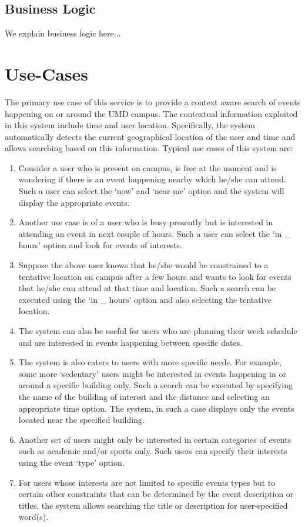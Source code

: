 \documentclass{acm_proc_article-sp}
\begin{document}
\subsection{Business Logic}
We explain business logic here...

\section{Use-Cases}
The primary use case of this service is to provide a context aware search of events happening on or around the UMD campus. The contextual information exploited in this system include time and user location. Specifically, the system automatically detects the current geographical location of the user and time and allows searching based on this information. Typical use cases of this system are:
\begin{enumerate}
\item{Consider a user who is present on campus, is free at the moment and is wondering if there is an event happening nearby which he/she can attend. Such a user can select the `now' and `near me' option and the system will display the appropriate events.}
\item{Another use case is of a user who is busy presently but is interested in attending an event in next couple of hours. Such a user can select the `in \_ hours' option and look for events of interests.}
\item{Suppose the above user knows that he/she would be constrained to a tentative location on campus after a few hours and wants to look for events that he/she can attend at that time and location. Such a search can be executed using the `in \_ hours' option and also selecting the tentative location.}
\item{The system can also be useful for users who are planning their week schedule and are interested in events happening between specific dates. }
\item{The system is also caters to users with more specific needs. For example, some more `sedentary' users might be interested in events happening in or around a specific building only. Such a search can be executed by specifying the name of the building of interest and the distance and selecting an appropriate time option. The system, in such a case displays only the events located near the specified building.}
\item{Another set of users might only be interested in certain categories of events such as academic and/or sports only. Such users can specify their interests using the event `type' option.}
\item{For users whose interests are not limited to specific events types but to certain other constraints that can be determined by the event description or titles, the system allows searching the title or description for user-specified word(s).}
\end{enumerate}
\end{document}
